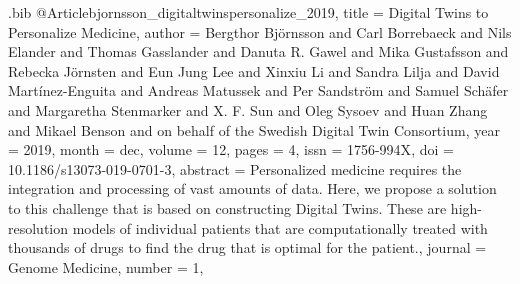 \documentclass[
  table,
  10pt,
  a4paper]{article}
\begin{document}
\begin{filecontents}{\jobname.bib}
@Article{bjornsson_digitaltwinspersonalize_2019,
	title = {Digital Twins to Personalize Medicine},
	author = {Bergthor Bj{\"o}rnsson and Carl Borrebaeck and Nils Elander and Thomas Gasslander and Danuta R. Gawel and Mika Gustafsson and Rebecka J{\"o}rnsten and Eun Jung Lee and Xinxiu Li and Sandra Lilja and David Mart\'inez-Enguita and Andreas Matussek and Per Sandstr{\"o}m and Samuel Sch{\"a}fer and Margaretha Stenmarker and X. F. Sun and Oleg Sysoev and Huan Zhang and Mikael Benson and {on behalf of the Swedish Digital Twin Consortium}},
	year = {2019},
	month = {dec},
	volume = {12},
	pages = {4},
	issn = {1756-994X},
	doi = {10.1186/s13073-019-0701-3},
	abstract = {Personalized medicine requires the integration and processing of vast amounts of data. Here, we propose a solution to this challenge that is based on constructing Digital Twins. These are high-resolution models of individual patients that are computationally treated with thousands of drugs to find the drug that is optimal for the patient.},
	journal = {Genome Medicine},
	number = {1},
}


\end{filecontents}
\end{document}
